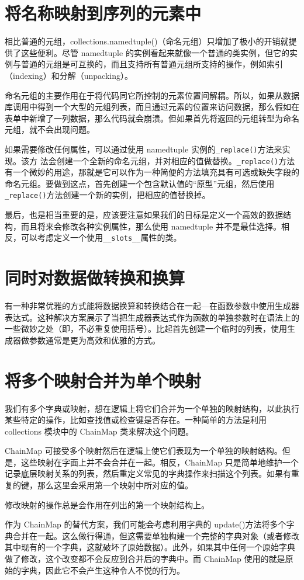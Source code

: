 \section{将名称映射到序列的元素中}
相比普通的元组，collections.namedtuple()（命名元组）只增加了极小的开销就提供了这些便利。尽管 namedtuple 的实例看起来就像一个普通的类实例，但它的实例与普通的元组是可互换的，而且支持所有普通元组所支持的操作，例如索引（indexing）和分解（unpacking）。

命名元组的主要作用在于将代码同它所控制的元素位置间解耦。所以，如果从数据库调用中得到一个大型的元组列表，而且通过元素的位置来访问数据，那么假如在表单中新增了一列数据，那么代码就会崩溃。但如果首先将返回的元组转型为命名元组，就不会出现问题。

如果需要修改任何属性，可以通过使用 namedtuple 实例的\verb|_replace()|方法来实现。该方
法会创建一个全新的命名元组，并对相应的值做替换。\verb|_replace()|方法有一个微妙的用途，那就是它可以作为一种简便的方法填充具有可选或缺失字段的命名元组。要做到这点，首先创建一个包含默认值的“原型”元组，然后使用\verb|_replace()|方法创建一个新的实例，把相应的值替换掉。

最后，也是相当重要的是，应该要注意如果我们的目标是定义一个高效的数据结构，而且将来会修改各种实例属性，那么使用 namedtuple 并不是最佳选择。相反，可以考虑定义一个使用\verb|__slots__|属性的类。

\section{同时对数据做转换和换算}
有一种非常优雅的方式能将数据换算和转换结合在一起—在函数参数中使用生成器表达式。这种解决方案展示了当把生成器表达式作为函数的单独参数时在语法上的一些微妙之处（即，不必重复使用括号）。比起首先创建一个临时的列表，使用生成器做参数通常是更为高效和优雅的方式。
\section{将多个映射合并为单个映射}
我们有多个字典或映射，想在逻辑上将它们合并为一个单独的映射结构，以此执行某些特定的操作，比如查找值或检查键是否存在。一种简单的方法是利用 collections 模块中的 ChainMap 类来解决这个问题。

ChainMap 可接受多个映射然后在逻辑上使它们表现为一个单独的映射结构。但是，这些映射在字面上并不会合并在一起。相反，ChainMap 只是简单地维护一个记录底层映射关系的列表，然后重定义常见的字典操作来扫描这个列表。如果有重复的键，那么这里会采用第一个映射中所对应的值。

修改映射的操作总是会作用在列出的第一个映射结构上。

作为 ChainMap 的替代方案，我们可能会考虑利用字典的 update()方法将多个字典合并在一起。这么做行得通，但这需要单独构建一个完整的字典对象（或者修改其中现有的一个字典，这就破坏了原始数据）。此外，如果其中任何一个原始字典做了修改，这个改变都不会反应到合并后的字典中。而 ChainMap 使用的就是原始的字典，因此它不会产生这种令人不悦的行为。